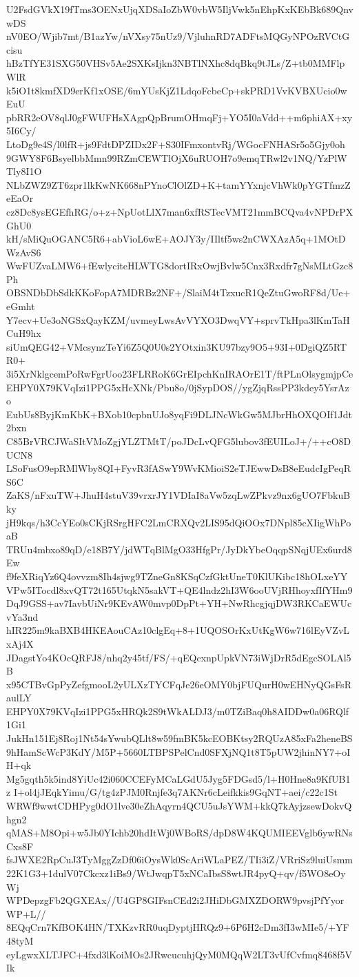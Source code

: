 U2FsdGVkX19fTms3OENxUjqXDSaIoZbW0vbW5IljVwk5nEhpKxKEbBk689QnvwDS
nV0EO/Wjib7mt/B1azYw/nVXsy75nUz9/VjluhnRD7ADFtsMQGyNPOzRVCtGcisu
hBzTfYE31SXG50VHSv5Ae2SXKsIjkn3NBTlNXhc8dqBkq9tJLs/Z+tb0MMFlpWlR
k5iO1t8kmfXD9erKf1xOSE/6mYUsKjZ1LdqoFcbeCp+skPRD1VvKVBXUcio0wEuU
pbRR2eOV8qlJ0gFWUFHsXAgpQpBrumOHmqFj+YO5I0aVdd++m6phiAX+xy5I6Cy/
LtoDg9e4S/l0lfR+js9FdtDPZIDx2F+S30IFmxontvRj/WGocFNHASr5o5Gjy0oh
9GWY8F6BsyelbbMmn99RZmCEWTlOjX6uRUOH7o9emqTRwl2v1NQ/YzPlWTly8I1O
NLbZWZ9ZT6zpr1lkKwNK668nPYnoClOlZD+K+tamYYxnjcVhWk0pYGTfmzZeEaOr
cz8Dc8ysEGEfhRG/o+z+NpUotLlX7man6xfRSTecVMT21mmBCQva4vNPDrPXGhU0
kH/sMiQuOGANC5R6+abVioL6wE+AOJY3y/IIltf5ws2nCWXAzA5q+1MOtDWzAvS6
WwFUZvaLMW6+fEwlyciteHLWTG8dortIRxOwjBvlw5Cnx3Rxdfr7gNsMLtGzc8Ph
OBSNDbDbSdkKKoFopA7MDRBz2NF+/SlaiM4tTzxucR1QeZtuGwoRF8d/Ue+eGmht
Y7ecv+Ue3oNGSxQayKZM/uvmeyLwsAvVYXO3DwqVY+sprvTkHpa3lKmTaHCuH9hx
siUmQEG42+VMcsynzTeYi6Z5Q0U0s2YOtxin3KU97bzy9O5+93I+0DgiQZ5RTR0+
3i5XrNklgcemPoRwFgrUoo23FLRRoK6GrEIpchKnIRAOrE1T/ftPLnOlsygmjpCe
EHPY0X79KVqIzi1PPG5xHcXNk/Pbu8o/0jSypDOS//ygZjqRssPP3kdey5YsrAzo
EubUs8ByjKmKbK+BXob10cpbnUJo8yqFi9DLJNcWkGw5MJbrHhOXQOIf1Jdt2bxn
C85BrVRCJWaSItVMoZgjYLZTMtT/poJDcLvQFG5lubov3fEUILoJ+/++cO8DUCN8
LSoFusO9epRMlWby8QI+FyvR3fASwY9WvKMioiS2eTJEwwDsB8eEudcIgPeqRS6C
ZaKS/nFxuTW+JhuH4stuV39vrxrJY1VDIaI8aVw5zqLwZPkvz9nx6gUO7FbkuBky
jH9kqs/h3CcYEo0sCKjRSrgHFC2LmCRXQv2LIS95dQiOOx7DNpl85cXIigWhPoaB
TRUu4mbxo89qD/e18B7Y/jdWTqBlMgO33HfgPr/JyDkYbeOqqpSNqjUEx6urd8Ew
f9feXRiqYz6Q4ovvzm8Ih4sjwg9TZneGn8KSqCzfGktUneT0KlUKibc18hOLxeYY
VPw5ITocdl8xvQT72t165UtqkN5sakVT+QE4lndz2hI3W6ooUVjRHhoyxfIfYHm9
DqJ9GSS+av7IavbUiNr9KEvAW0mvp0DpPt+YH+NwRhcgjqjDW3RKCaEWUcvYa3nd
hIR225m9kaBXB4HKEAouCAz10clgEq+8+1UQOSOrKxUtKgW6w716lEyVZvLxAj4X
JDagstYo4KOcQRFJ8/nhq2y45tf/FS/+qEQcxnpUpkVN73iWjDrR5dEgcSOLAl5B
x95CTBvGpPyZefgmooL2yULXzTYCFqJe26eOMY0bjFUQurH0wEHNyQGsFsRaulLY
EHPY0X79KVqIzi1PPG5xHRQk2S9tWkALDJ3/m0TZiBaq0h8AIDDw0a06RQlf1Gi1
JukHn151Ej8Roj1Nt54sYwubQLlt8w59fmBK5kcEOBKtsy2RQUzA85xFa2heneBS
9hHamScWcP3KdY/M5P+5660LTBPSPelCnd0SFXjNQ1t8T5pUW2jhinNY7+oIH+qk
Mg5gqth5k5ind8YiUc42i060CCEFyMCaLGdU5Jyg5FDGsd5/l+H0Hne8a9KfUB1z
I+ol4jJEqkYimu/G/tg4zPJM0Rnjfe3q7AKNr6cLeifkkis9GqNT+aei/c22c1St
WRWf9wwtCDHPyg0dO1lve30eZhAqyrn4QCU5uJsYWM+kkQ7kAyjzsewDokvQhgn2
qMAS+M8Opi+w5Jb0YIchb20hdItWj0WBoRS/dpD8W4KQUMIEEVglb6ywRNsCxs8F
fsJWXE2RpCuJ3TyMggZzDf06iOysWk0ScAriWLaPEZ/TIi3iZ/VRriSz9luiUsmm
22K1G3+1dulV07Ckcxz1iBs9/WtJwqpT5xNCaIbsS8wtJR4pyQ+qv/f5WO8eOyWj
WPDepzgFb2QGXEAx//U4GP8GIFsnCEd2i2JHiDbGMXZDORW9pvsjPfYyorWP+L//
8EQqCrn7KfBOK4HN/TXKzvRR0uqDyptjHRQz9+6P6H2cDm3fI3wMIe5/+YF48tyM
eyLgwxXLTJFC+4fxd3lKoiMOs2JRwcucuhjQyM0MQqW2LT3vUfCvfmq8468f5VIk
